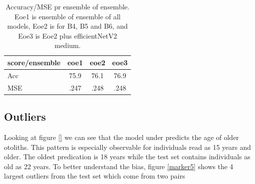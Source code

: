 \documentclass[10pt,letterpaper]{article}
\begin{document}
\begin{center}
\begin{table}[hbt!]
\caption{Accuracy/MSE pr ensemble of ensemble.
Eoe1 is ensemble of ensemble of all models, Eoe2 is for B4, B5 and B6,
and Eoe3 is Eoe2 plus efficientNetV2 medium.}
\begin{tabular}{ |l|c|c|c| }
\hline
score/ensemble & eoe1 & eoe2 & eoe3  \\ \hline
Acc & 75.9 & 76.1 & 76.9 \\ 
MSE & .247 & .248 & .248  \\ 
\hline
\end{tabular}
\end{table}
\end{center}



\subsection*{Outliers}

Looking at figure \ref{} we can see that the model under predicts the age of older otoliths. This pattern is especially observable for individuals read as 15 years and older. The oldest predication is 18 years while the test set contains individuals as old as 22 years. To better understand the bias, figure \ref{marker5} shows the 4 largest outliers from the test set which come from two pairs
\end{document}
